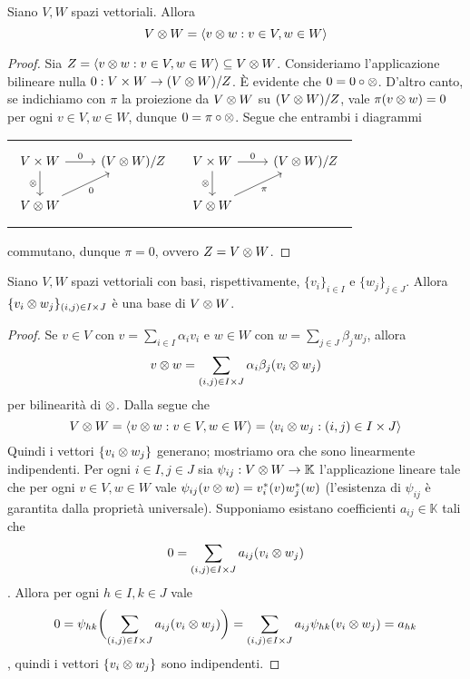 \begin{proposition}
Siano $V\comma W$ spazi vettoriali. Allora
$$
V\otimes W=\langle v\otimes w:v\in V, w\in W\rangle
$$
\end{proposition}
\begin{proof}
Sia $Z=\langle v\otimes w:v\in V, w\in W\rangle\subseteq V\otimes W$. Consideriamo l'applicazione bilineare nulla $0:V\times W\to (V\otimes W)/Z$. È evidente che $0=0\circ\otimes$. D'altro canto, se indichiamo con $\pi$ la proiezione da $V\otimes W$ su $(V\otimes W)/Z$, vale $\pi(v\otimes w)=0$ per ogni $v\in V,w\in W$, dunque $0=\pi\circ\otimes$. Segue che entrambi i diagrammi\\
\begin{tabularx}{\textwidth}{XX}
$$
\begin{tikzcd}[ampersand replacement = \&]
V\times W\arrow[r,"0"]\arrow[d,"\tensor",swap]\&(V\tensor W)/Z\\
V\tensor W\arrow[ru,"0",swap]
\end{tikzcd}
$$
&
$$
\begin{tikzcd}[ampersand replacement = \&]
V\times W\arrow[r,"0"]\arrow[d,"\tensor",swap]\&(V\tensor W)/Z\\
V\tensor W\arrow[ru,"\pi",swap]
\end{tikzcd}
$$
\end{tabularx}
commutano, dunque $\pi=0$, ovvero $Z=V\otimes W$.
\end{proof}

\begin{proposition}
Siano $V\comma W$ spazi vettoriali con basi, rispettivamente, $\{v_i\}_{i\in I}$ e $\{w_j\}_{j\in J}$. Allora $\{v_i\otimes w_j\}_{(i,j)\in I\times J}$ è una base di $V\otimes W$.
\end{proposition}
\begin{proof}
Se $v\in V$ con $v=\sum_{i\in I}\alpha_i v_i$ e $w\in W$ con $w=\sum_{j\in J}\beta_j w_j$, allora
$$
v\otimes w=\sum_{(i,j)\in I\times J}\alpha_i\beta_j(v_i\otimes w_j)
$$
per bilinearità di $\otimes$. Dalla  segue che
$$
V\otimes W=\langle v\otimes w:v\in V, w\in W\rangle=\langle v_i\otimes w_j:(i,j)\in I\times J\rangle
$$
Quindi i vettori $\{v_i\otimes w_j\}$ generano; mostriamo ora che sono linearmente indipendenti. Per ogni $i\in I,j\in J$ sia $\psi_{ij}:V\otimes W\to\mathbb{K}$ l'applicazione lineare tale che per ogni $v\in V,w\in W$ vale $\psi_{ij}(v\otimes w)=v_i^*(v)w_j^*(w)$ (l'esistenza di $\psi_{ij}$ è garantita dalla proprietà universale). Supponiamo esistano coefficienti $a_{ij}\in\mathbb{K}$ tali che
$$
0=\sum_{(i,j)\in I\times J}a_{ij}(v_i\otimes w_j)
$$
. Allora per ogni $h\in I,k\in J$ vale
$$
0=\psi_{hk}\biggl(\sum_{(i,j)\in I\times J}a_{ij}(v_i\otimes w_j)\biggr)=\sum_{(i,j)\in I\times J}a_{ij}\psi_{hk}(v_i\otimes w_j)=a_{hk}
$$
, quindi i vettori $\{v_i\otimes w_j\}$ sono indipendenti.
\end{proof}


